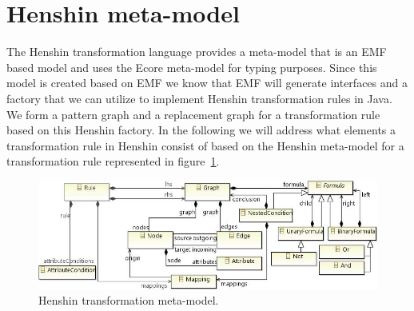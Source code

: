 
\section{Henshin meta-model}

The Henshin transformation language provides a meta-model that is an EMF based
model and uses the Ecore meta-model for typing purposes\cite{Arendt2010}. Since
this model is created based on EMF we know that EMF will generate interfaces and
a factory that we can utilize to implement Henshin transformation rules in Java.
We form a pattern graph and a replacement graph for a transformation rule based
on this Henshin factory. In the following we will address what elements a
transformation rule in Henshin consist of based on the Henshin meta-model for a
transformation rule represented in figure~\ref{fig:Henshin_metamodel}.
 

\begin{figure}[H]
	\centering
	\includegraphics[scale=0.8]{./Figures/Henshin_metamodel.png}
	\caption[Henshin transformation meta-model]
	{Henshin transformation meta-model\cite{Arendt2010}.}
	\label{fig:Henshin_metamodel}
\end{figure}

